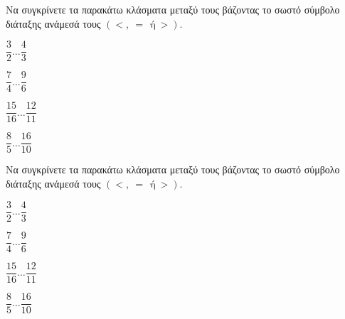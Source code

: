 Να συγκρίνετε τα παρακάτω κλάσματα μεταξύ τους βάζοντας το σωστό σύμβολο διάταξης ανάμεσά τους $ (<,\ =\ \ \textrm{ή}\ >) $.
\begin{multicols}{3}
\begin{rlist}[leftmargin=3mm]
\item $ \dfrac{3}{2}\ldots \dfrac{4}{3} $
\item $ \dfrac{7}{4}\ldots \dfrac{9}{6} $
\item $ \dfrac{15}{16}\ldots \dfrac{12}{11} $
\item $ \dfrac{8}{5}\ldots \dfrac{16}{10} $
\end{rlist}
\end{multicols}
Να συγκρίνετε τα παρακάτω κλάσματα μεταξύ τους βάζοντας το σωστό σύμβολο διάταξης ανάμεσά τους $ (<,\ =\ \ \textrm{ή}\ >) $.
\begin{multicols}{3}
\begin{rlist}[leftmargin=3mm]
\item $ \dfrac{3}{2}\ldots \dfrac{4}{3} $
\item $ \dfrac{7}{4}\ldots \dfrac{9}{6} $
\item $ \dfrac{15}{16}\ldots \dfrac{12}{11} $
\item $ \dfrac{8}{5}\ldots \dfrac{16}{10} $
\end{rlist}
\end{multicols}
